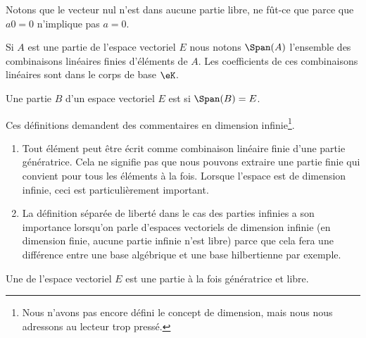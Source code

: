 \begin{remark}
	Notons que le vecteur nul n'est dans aucune partie libre, ne fût-ce que parce que \( a0=0\) n'implique pas \( a=0\).
\end{remark}

Si \( A\) est une partie de l'espace vectoriel \( E\) nous notons \( \Span(A)\) l'ensemble des combinaisons linéaires finies d'éléments de \( A\). Les coefficients de ces combinaisons linéaires sont dans le corps de base \( \eK\).

\begin{definition}
	Une partie $B$ d'un espace vectoriel \( E\) est  si \( \Span(B)=E\).
\end{definition}

\begin{remark}
	Ces définitions demandent des commentaires en dimension infinie\footnote{Nous n'avons pas encore défini le concept de dimension, mais nous nous adressons au lecteur trop pressé.}.

	\begin{enumerate}
		\item
		      Tout élément peut être écrit comme combinaison linéaire finie d'une partie génératrice. Cela ne signifie pas que nous pouvons extraire une partie finie qui convient pour tous les éléments à la fois. Lorsque l'espace est de dimension infinie, ceci est particulièrement important.
		\item
		      La définition séparée de liberté dans le cas des parties infinies a son importance lorsqu'on parle d'espaces vectoriels de dimension infinie (en dimension finie, aucune partie infinie n'est libre) parce que cela fera une différence entre une base algébrique et une base hilbertienne par exemple.
	\end{enumerate}
\end{remark}

\begin{definition}[Base]        \label{DEFooNGDSooEDAwTh}
	Une  de l'espace vectoriel \( E\) est une partie à la fois génératrice et libre.
\end{definition}

